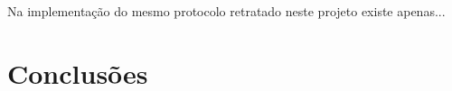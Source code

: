 Na implementação do mesmo protocolo retratado neste projeto existe apenas...




\section{Conclusões}
\label{chap2:sec:concs}

